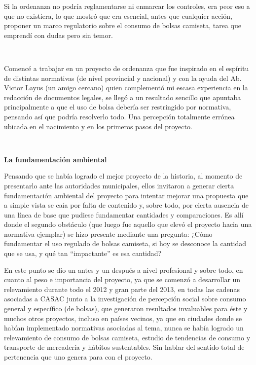 \begin{fullwidth}
Si la ordenanza no podría reglamentarse ni enmarcar los controles, era
peor eso a que no existiera, lo que mostró que era esencial, antes que
cualquier acción, proponer un marco regulatorio sobre el consumo de
bolsas camiseta, tarea que emprendí con dudas pero sin temor.

~

Comencé a trabajar en un proyecto de ordenanza que fue inspirado en el
espíritu de distintas normativas (de nivel provincial y nacional) y con
la ayuda del Ab. Victor Layus (un amigo cercano) quien complementó mi
escasa experiencia en la redacción de documentos legales, se llegó a un
resultado sencillo que apuntaba principalmente a que el uso de bolsa
debería ser restringido por normativa, pensando así que podría
resolverlo todo. Una percepción totalmente errónea ubicada en el
nacimiento y en los primeros pasos del proyecto.

~

\textbf{La fundamentación ambiental}

Pensando que se había logrado el mejor proyecto de la historia, al
momento de presentarlo ante las autoridades municipales, ellos invitaron
a generar cierta fundamentación ambiental del proyecto para intentar
mejorar una propuesta que a simple vista se caía por falta de contenido
y, sobre todo, por cierta ausencia de una línea de base que pudiese
fundamentar cantidades y comparaciones. Es allí donde el segundo
obstáculo (que luego fue aquello que elevó el proyecto hacia una
normativa ejemplar) se hizo presente mediante una pregunta: ¿Cómo
fundamentar el uso regulado de bolsas camiseta, si hoy se desconoce la
cantidad que se usa, y qué tan ``impactante'' es esa cantidad?

En este punto se dio un antes y un después a nivel profesional y sobre
todo, en cuanto al peso e importancia del proyecto, ya que se comenzó a
desarrollar un relevamiento durante todo el 2012 y gran parte del 2013,
en todas las cadenas asociadas a CASAC junto a la investigación de
percepción social sobre consumo general y específico (de bolsas), que
generaron resultados invaluables para éste y muchos otros proyectos,
incluso en países vecinos, ya que en ciudades donde se habían
implementado normativas asociadas al tema, nunca se había logrado un
relevamiento de consumo de bolsas camiseta, estudio de tendencias de
consumo y transporte de mercadería y hábitos sustentables. Sin hablar
del sentido total de pertenencia que uno genera para con el proyecto.

~


\end{fullwidth}
